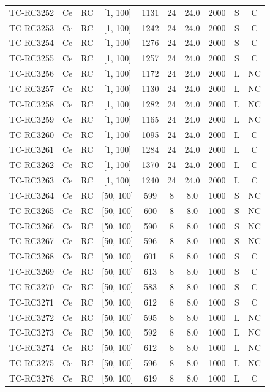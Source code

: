 \begin{longtable}{lccccccccc}
TC-RC3252 & Ce & RC & [1, 100] & 1131 & 24 & 24.0 & 2000 & S & C \\
TC-RC3253 & Ce & RC & [1, 100] & 1242 & 24 & 24.0 & 2000 & S & C \\
TC-RC3254 & Ce & RC & [1, 100] & 1276 & 24 & 24.0 & 2000 & S & C \\
TC-RC3255 & Ce & RC & [1, 100] & 1257 & 24 & 24.0 & 2000 & S & C \\
TC-RC3256 & Ce & RC & [1, 100] & 1172 & 24 & 24.0 & 2000 & L & NC \\
TC-RC3257 & Ce & RC & [1, 100] & 1130 & 24 & 24.0 & 2000 & L & NC \\
TC-RC3258 & Ce & RC & [1, 100] & 1282 & 24 & 24.0 & 2000 & L & NC \\
TC-RC3259 & Ce & RC & [1, 100] & 1165 & 24 & 24.0 & 2000 & L & NC \\
TC-RC3260 & Ce & RC & [1, 100] & 1095 & 24 & 24.0 & 2000 & L & C \\
TC-RC3261 & Ce & RC & [1, 100] & 1284 & 24 & 24.0 & 2000 & L & C \\
TC-RC3262 & Ce & RC & [1, 100] & 1370 & 24 & 24.0 & 2000 & L & C \\
TC-RC3263 & Ce & RC & [1, 100] & 1240 & 24 & 24.0 & 2000 & L & C \\
TC-RC3264 & Ce & RC & [50, 100] & 599 & 8 & 8.0 & 1000 & S & NC \\
TC-RC3265 & Ce & RC & [50, 100] & 600 & 8 & 8.0 & 1000 & S & NC \\
TC-RC3266 & Ce & RC & [50, 100] & 590 & 8 & 8.0 & 1000 & S & NC \\
TC-RC3267 & Ce & RC & [50, 100] & 596 & 8 & 8.0 & 1000 & S & NC \\
TC-RC3268 & Ce & RC & [50, 100] & 601 & 8 & 8.0 & 1000 & S & C \\
TC-RC3269 & Ce & RC & [50, 100] & 613 & 8 & 8.0 & 1000 & S & C \\
TC-RC3270 & Ce & RC & [50, 100] & 583 & 8 & 8.0 & 1000 & S & C \\
TC-RC3271 & Ce & RC & [50, 100] & 612 & 8 & 8.0 & 1000 & S & C \\
TC-RC3272 & Ce & RC & [50, 100] & 595 & 8 & 8.0 & 1000 & L & NC \\
TC-RC3273 & Ce & RC & [50, 100] & 592 & 8 & 8.0 & 1000 & L & NC \\
TC-RC3274 & Ce & RC & [50, 100] & 612 & 8 & 8.0 & 1000 & L & NC \\
TC-RC3275 & Ce & RC & [50, 100] & 596 & 8 & 8.0 & 1000 & L & NC \\
TC-RC3276 & Ce & RC & [50, 100] & 619 & 8 & 8.0 & 1000 & L & C \\

\end{longtable}

